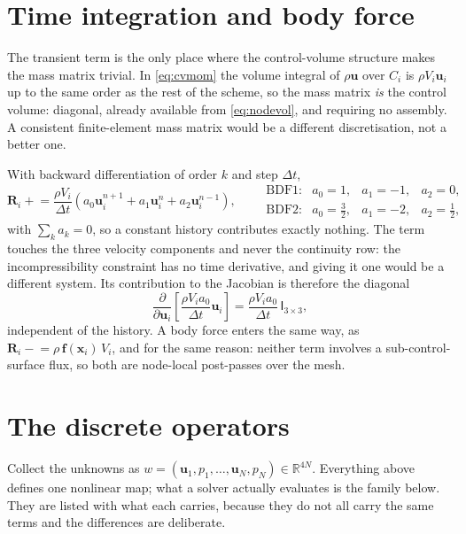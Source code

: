 \documentclass[11pt,a4paper]{article}
\newcommand{\bu}{\mathbf{u}}
\newcommand{\bx}{\mathbf{x}}
\newcommand{\bR}{\mathbf{R}}
\newcommand{\bff}{\mathbf{f}}
\newcommand{\bI}{\mathsf{I}}
\begin{document}
\section{Time integration and body force}

The transient term is the only place where the control-volume structure makes the mass matrix
trivial. In \eqref{eq:cvmom} the volume integral of $\rho\bu$ over $C_i$ is $\rho V_i \bu_i$
up to the same order as the rest of the scheme, so the mass matrix \emph{is} the control
volume: diagonal, already available from \eqref{eq:nodevol}, and requiring no assembly. A
consistent finite-element mass matrix would be a different discretisation, not a better one.

With backward differentiation of order $k$ and step $\Delta t$,
\begin{equation}
  \bR_i \mathrel{+}= \frac{\rho V_i}{\Delta t}
  \left( a_0 \bu_i^{n+1} + a_1 \bu_i^{n} + a_2 \bu_i^{n-1} \right),
  \qquad
  \begin{array}{lccc}
    \text{BDF1:} & a_0 = 1, & a_1 = -1, & a_2 = 0, \\
    \text{BDF2:} & a_0 = \tfrac32, & a_1 = -2, & a_2 = \tfrac12,
  \end{array}
  \label{eq:bdf}
\end{equation}
with $\sum_k a_k = 0$, so a constant history contributes exactly nothing. The term touches the
three velocity components and never the continuity row: the incompressibility constraint has
no time derivative, and giving it one would be a different system. Its contribution to the
Jacobian is therefore the diagonal
\begin{equation}
  \frac{\partial}{\partial \bu_i}
  \left[ \frac{\rho V_i a_0}{\Delta t} \bu_i \right]
  = \frac{\rho V_i a_0}{\Delta t} \, \bI_{3\times3} ,
  \label{eq:bdfjac}
\end{equation}
independent of the history. A body force enters the same way, as $\bR_i \mathrel{-}=
\rho\,\bff(\bx_i)\, V_i$, and for the same reason: neither term involves a sub-control-surface
flux, so both are node-local post-passes over the mesh.

\section{The discrete operators}
\label{sec:operators}

Collect the unknowns as $w = (\bu_1,p_1,\dots,\bu_N,p_N) \in \mathbb{R}^{4N}$. Everything
above defines one nonlinear map; what a solver actually evaluates is the family below. They
are listed with what each carries, because they do not all carry the same terms and the
differences are deliberate.
\end{document}
